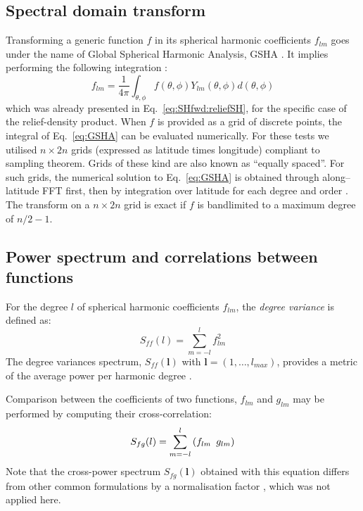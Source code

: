 \subsection{Spectral domain transform}
\label{ss:SigIs:Fwd:SHtransform}

Transforming a generic function $f$ in its spherical harmonic coefficients $f_{lm}$ goes under the name of Global Spherical Harmonic Analysis, GSHA \parencite{Sneeuw1994}.
It implies performing the following integration \parencite[Eq.~8 in][]{Wieczorek2007}:
\begin{equation}
    \label{eq:GSHA}
    f_{lm} =
    \frac{1}{4 \pi}
    \int_{\theta, \phi}
    f(\theta, \phi)
    Y_{lm}(\theta, \phi) d(\theta, \phi)
\end{equation}
which was already presented in Eq.~\ref{eq:SHfwd:reliefSH}, for the specific case of the relief-density product.
When $f$ is provided as a grid of discrete points, the integral of Eq.~\ref{eq:GSHA} can be evaluated numerically.
For these tests we utilised $n \times 2n$ grids (expressed as latitude times longitude) compliant to \textcite{Driscoll1994} sampling theorem.
Grids of these kind are also known as ``equally spaced''.
For such grids, the numerical solution to Eq.~\ref{eq:GSHA} is obtained through along--latitude FFT first, then by integration over latitude for each degree and order \parencites{Sneeuw1994}{Wieczorek2007}.
The transform on a $n \times 2n$ \textcite{Driscoll1994} grid is exact if $f$ is bandlimited to a maximum degree of $n/2 - 1$.

\subsection{Power spectrum and correlations between functions}
\label{ss:SigIs:Fwd:Spectrum}

For the degree $l$ of spherical harmonic coefficients $f_{lm}$, the \textit{degree variance} is defined as:
\begin{equation}
    \label{eq:DegVar}
    S_{ff}(l) = \sum_{m=-l}^{l} f_{lm}^2
\end{equation}
The degree variances spectrum, $S_{ff}(\bm{l})$ with $\bm{l} = (1, \dots, l_{max})$, provides a metric of the average power per harmonic degree \parencites{Rapp1982}{Wieczorek2007}{Hirt2015}.

Comparison between the coefficients of two functions, $f_{lm}$ and $g_{lm}$ may be performed by computing their cross-correlation:
\begin{equation}
    \label{eq:DegVarCross}
    S_{fg}(l) = \sum_{m=-l}^{l} \left( f_{lm} \enskip g_{lm} \right)
\end{equation}
Note that the cross-power spectrum $S_{fg}(\bm{l})$ obtained with this equation \parencite[Eq.~12 in][]{Wieczorek2007} differs from other common formulations \parencites[e.g.][]{Phillips1980}{Rapp1982}{Rexer2016} by a normalisation factor , which was not applied here.

